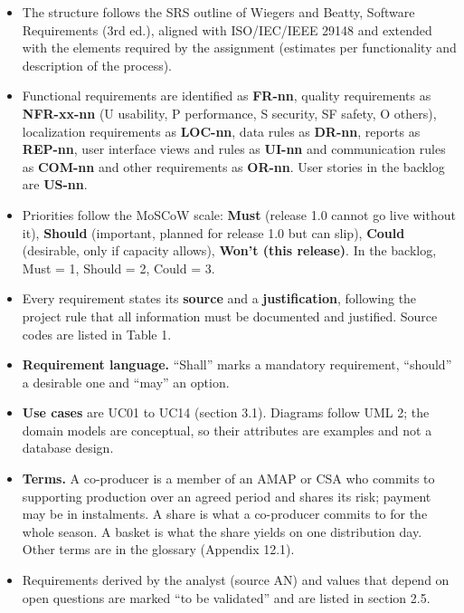 \documentclass[11pt,a4paper]{article}
\begin{document}
\begin{itemize}
  \item The structure follows the SRS outline of Wiegers and Beatty, Software Requirements (3rd ed.), aligned with ISO/IEC/IEEE 29148 and extended with the elements required by the assignment (estimates per functionality and description of the process).
  \item Functional requirements are identified as \textbf{FR-nn}, quality requirements as \textbf{NFR-xx-nn} (U usability, P performance, S security, SF safety, O others), localization requirements as \textbf{LOC-nn}, data rules as \textbf{DR-nn}, reports as \textbf{REP-nn}, user interface views and rules as \textbf{UI-nn} and communication rules as \textbf{COM-nn} and other requirements as \textbf{OR-nn}. User stories in the backlog are \textbf{US-nn}.
  \item Priorities follow the MoSCoW scale: \textbf{Must} (release 1.0 cannot go live without it), \textbf{Should} (important, planned for release 1.0 but can slip), \textbf{Could} (desirable, only if capacity allows), \textbf{Won't (this release)}. In the backlog, Must = 1, Should = 2, Could = 3.
  \item Every requirement states its \textbf{source} and a \textbf{justification}, following the project rule that all information must be documented and justified. Source codes are listed in Table 1.
  \item \textbf{Requirement language.} ``Shall'' marks a mandatory requirement, ``should'' a desirable one and ``may'' an option.
  \item \textbf{Use cases} are UC01 to UC14 (section 3.1). Diagrams follow UML 2; the domain models are conceptual, so their attributes are examples and not a database design.
  \item \textbf{Terms.} A co-producer is a member of an AMAP or CSA who commits to supporting production over an agreed period and shares its risk; payment may be in instalments. A share is what a co-producer commits to for the whole season. A basket is what the share yields on one distribution day. Other terms are in the glossary (Appendix 12.1).
  \item Requirements derived by the analyst (source AN) and values that depend on open questions are marked ``to be validated'' and are listed in section 2.5.
\end{itemize}
\end{document}
